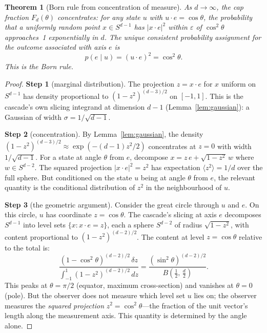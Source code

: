 \documentclass[12pt,a4paper]{article}
\newtheorem{theorem}{Theorem}[section]
\begin{document}
\begin{theorem}[Born rule from concentration of measure]\label{thm:born}
As $d\to\infty$, the cap fraction $F_d(\theta)$ concentrates: for any state $u$ with
$u\cdot e = \cos\theta$, the probability that a uniformly random point $x\in S^{d-1}$
has $|x\cdot e|^2$ within $\varepsilon$ of $\cos^2\theta$ approaches~1 exponentially
in $d$. The unique consistent probability assignment for the outcome associated with
axis $e$ is
\[
p(e\mid u) = (u\cdot e)^2 = \cos^2\theta.
\]
This is the Born rule.
\end{theorem}
\begin{proof}
\textbf{Step 1} (marginal distribution). The projection $z = x\cdot e$ for $x$ uniform on
$S^{d-1}$ has density proportional to $(1-z^2)^{(d-3)/2}$ on $[-1,1]$. This is the
cascade's own slicing integrand at dimension $d-1$
(Lemma~\ref{lem:gaussian}): a Gaussian of width $\sigma = 1/\sqrt{d-1}$.

\textbf{Step 2} (concentration). By Lemma~\ref{lem:gaussian}, the density
$(1-z^2)^{(d-3)/2} \approx \exp(-(d-1)z^2/2)$ concentrates at $z = 0$ with width
$1/\sqrt{d-1}$. For a state at angle $\theta$ from $e$, decompose $x = z\,e + \sqrt{1-z^2}\,w$
where $w\in S^{d-2}$. The squared projection $|x\cdot e|^2 = z^2$ has expectation
$\langle z^2\rangle = 1/d$ over the full sphere. But conditioned on the state $u$ being at
angle $\theta$ from $e$, the relevant quantity is the conditional distribution of $z^2$
in the neighbourhood of $u$.

\textbf{Step 3} (the geometric argument). Consider the great circle through $u$ and $e$.
On this circle, $u$ has coordinate $z = \cos\theta$. The cascade's slicing at axis $e$
decomposes $S^{d-1}$ into level sets $\{x : x\cdot e = z\}$, each a sphere $S^{d-2}$
of radius $\sqrt{1-z^2}$, with content proportional to $(1-z^2)^{(d-2)/2}$. The content
at level $z = \cos\theta$ relative to the total is:
\begin{equation}\label{eq:born-ratio}
\frac{(1-\cos^2\theta)^{(d-2)/2}\,\delta z}
{\int_{-1}^{1}(1-z^2)^{(d-2)/2}\,dz}
= \frac{(\sin^2\theta)^{(d-2)/2}}{B(\tfrac{1}{2},\,\tfrac{d}{2})}.
\end{equation}
This peaks at $\theta = \pi/2$ (equator, maximum cross-section) and vanishes at $\theta = 0$
(pole). But the observer does not measure which level set $u$ lies on; the observer measures
the \emph{squared projection} $z^2 = \cos^2\theta$---the fraction of the unit vector's
length along the measurement axis. This quantity is determined by the angle alone.


\end{proof}
\end{document}

